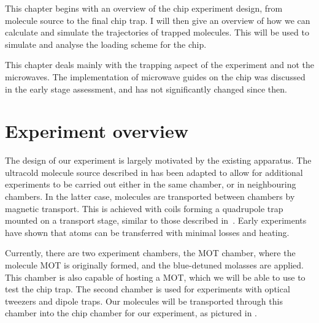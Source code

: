 This chapter begins with an overview of the chip experiment design, from
molecule source to the final chip trap. I will then give an overview of how we
can calculate and simulate the trajectories of trapped \CaF{} molecules. This
will be used to simulate and analyse the loading scheme for the chip.

This chapter deals mainly with the trapping aspect of the experiment and not
the microwaves. The implementation of microwave guides on the
chip was discussed in the early stage assessment, and has not significantly
changed since then.

\section{Experiment overview}

%
The design of our experiment is largely motivated by the existing apparatus.
The ultracold molecule source described in  has been
adapted to allow for additional experiments to be carried out either in the
same chamber, or in neighbouring chambers. In the latter case, molecules are
transported between chambers by magnetic transport. This is achieved with coils
forming a quadrupole trap mounted on a
transport stage, similar to those described
in~\cite{Lewandowski2003}. Early experiments have shown that \Rb{} atoms can be
transferred with minimal losses and heating.

%
Currently, there are two experiment chambers, the MOT chamber, where the
molecule MOT is originally formed, and the blue-detuned molasses are applied.
This chamber is also capable of hosting a \Rb{} MOT, which we will be able to
use to test the chip trap. The second chamber is used for experiments with
optical tweezers and dipole traps. Our molecules will be transported through
this chamber into the chip chamber for our experiment, as pictured in
.


